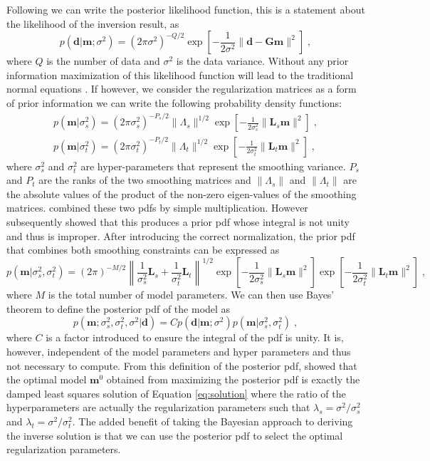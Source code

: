 Following \citet{ide1996} we can write the posterior likelihood function, this is a statement about the likelihood of the inversion result, as
\begin{equation}
p(\mathbf{d}|\mathbf{m};\sigma^2)=(2\pi\sigma^2)^{-Q/2}\exp\left[-\frac{1}{2\sigma^2}\|\mathbf{d}-\mathbf{Gm}\|^2\right]\;,
\end{equation}
where $Q$ is the number of data and $\sigma^2$ is the data variance. Without any prior information maximization of this likelihood function will lead to the traditional normal equations \citep{menke2012}. If however, we consider the regularization matrices as a form of prior information we can write the following probability density functions:
\begin{eqnarray}
p(\mathbf{m}|\sigma_s^2)=(2\pi\sigma_s^2)^{-P_s/2}\|\Lambda_s\|^{1/2}\exp\left[-\frac{1}{2\sigma_s^2}\|\mathbf{L}_s\mathbf{m}\|^2\right]\;,\\
p(\mathbf{m}|\sigma_t^2)=(2\pi\sigma_t^2)^{-P_t/2}\|\Lambda_t\|^{1/2}\exp\left[-\frac{1}{2\sigma_t^2}\|\mathbf{L}_t\mathbf{m}\|^2\right]\;,
\end{eqnarray}
where $\sigma^2_s$ and $\sigma^2_t$ are hyper-parameters that represent the smoothing variance. $P_s$ and $P_t$ are the ranks of the two smoothing matrices and $\|\Lambda_s\|$ and $\|\Lambda_t\|$ are the absolute values of the product of the non-zero eigen-values of the smoothing matrices. \citet{ide1996} combined these two pdfs by simple multiplication. However \citet{fukahata2003} subsequently showed that this produces a prior pdf whose integral is not unity and thus is improper. After introducing the correct normalization, the prior pdf that combines both smoothing constraints can be expressed as
\begin{equation}
p(\mathbf{m}|\sigma_s^2,\sigma^2_t)=(2\pi)^{-M/2}\left\|\frac{1}{\sigma_s^2}\mathbf{L}_s+\frac{1}{\sigma_t^2}\mathbf{L}_t \right\|^{1/2}\exp\left[-\frac{1}{2\sigma_s^2}\|\mathbf{L}_s\mathbf{m}\|^2\right]\exp\left[-\frac{1}{2\sigma_t^2}\|\mathbf{L}_t\mathbf{m}\|^2\right]\;,
\end{equation}
where $M$ is the total number of model parameters. We can then use Bayes' theorem to define the posterior pdf of the model as
\begin{equation}
p(\mathbf{m};\sigma_s^2,\sigma_t^2,\sigma^2|\mathbf{d})=Cp(\mathbf{d}|\mathbf{m};\sigma^2)p(\mathbf{m}|\sigma_s^2,\sigma^2_t)\;,
\end{equation}
where $C$ is  a factor introduced to ensure the integral of the pdf is unity. It is, however, independent of the model parameters and hyper parameters and thus not necessary to compute. From this definition of the posterior pdf, \citet{jackson1985} showed that the optimal model $\mathbf{m}^0$ obtained from maximizing the posterior pdf is exactly the damped least squares solution of Equation \ref{eq:solution} where the ratio of the hyperparameters are actually the regularization parameters such that $\lambda_s=\sigma^2/\sigma^2_s$ and $\lambda_t=\sigma^2/\sigma^2_t$. The added benefit of taking the Bayesian approach to deriving the inverse solution is that we can use the posterior pdf to select the optimal regularization parameters.
	
